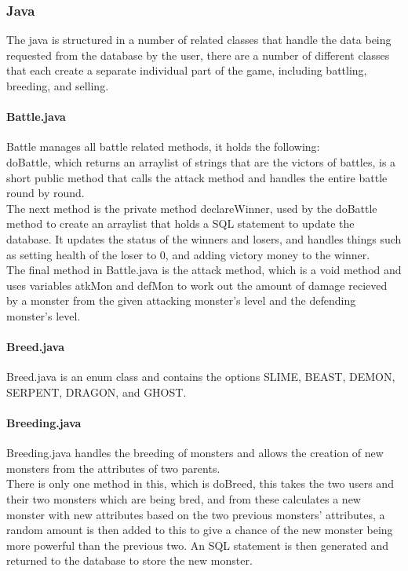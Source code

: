 \documentclass{project}
\begin{document}
\subsubsection{Java}
The java is structured in a number of related classes that handle the data being requested from the database by the user, there are a number of different classes that each create a separate individual part of the game, including battling, breeding, and selling.

\paragraph{Battle.java}
Battle manages all battle related methods, it holds the following:\\
doBattle, which returns an arraylist of strings that are the victors of battles, is a short public method that calls the attack method and handles the entire battle round by round.\\
The next method is the private method declareWinner, used by the doBattle method to create an arraylist that holds a SQL statement to update the database. It updates the status of the winners and losers, and handles things such as setting health of the loser to 0, and adding victory money to the winner.\\
The final method in Battle.java is the attack method, which is a void method and uses variables atkMon and defMon to work out the amount of damage recieved by a monster from the given attacking monster's level and the defending monster's level.
\paragraph{Breed.java}
Breed.java is an enum class and contains the options SLIME, BEAST, DEMON, SERPENT, DRAGON, and GHOST.
\paragraph{Breeding.java}
Breeding.java handles the breeding of monsters and allows the creation of new monsters from the attributes of two parents.\\
There is only one method in this, which is doBreed, this takes the two users and their two monsters which are being bred, and from these calculates a new monster with new attributes based on the two previous monsters' attributes, a random amount is then added to this to give a chance of the new monster being more powerful than the previous two. An SQL statement is then generated and returned to the database to store the new monster.
\end{document}
